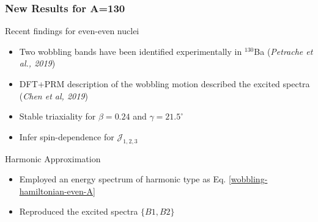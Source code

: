 \documentclass{beamer}
\begin{document}
\begin{frame}
  \frametitle{New Results for A=130}
  \begin{minipage}{.8\textwidth}
    \begin{block}{Recent findings for even-even nuclei}
      \begin{itemize}
        \item Two wobbling bands have been identified experimentally in $^{130}$Ba (\textit{Petrache et al., 2019})
        \item DFT+PRM description of the wobbling motion described the excited spectra (\textit{Chen et al, 2019})
        \item Stable triaxiality for $\beta=0.24$ and $\gamma=21.5^\circ$
        \item Infer spin-dependence for $\mathcal{J}_{1,2,3}$
      \end{itemize}
    \end{block}
    \begin{alertblock}{Harmonic Approximation}
      \begin{itemize}
        \item Employed an energy spectrum of harmonic type as Eq. \ref{wobbling-hamiltonian-even-A}
        \item Reproduced the excited spectra $\{B1,B2\}$
      \end{itemize}
    \end{alertblock}
  \end{minipage}%
  \begin{minipage}{.2\textwidth}
    \begin{figure}
      \centering

\end{figure}
\end{minipage}
\end{frame}
\end{document}
